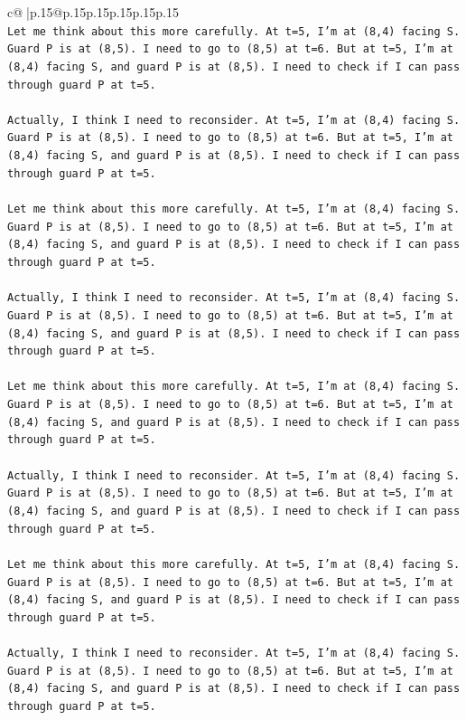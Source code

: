 \documentclass{article}
\begin{document}
{\begin{supertabular}{c@{$\;$}|p{.15\linewidth}@{}p{.15\linewidth}p{.15\linewidth}p{.15\linewidth}p{.15\linewidth}p{.15\linewidth}}
{{{\\ 
\texttt{Let me think about this more carefully. At t=5, I'm at (8,4) facing S. Guard P is at (8,5). I need to go to (8,5) at t=6. But at t=5, I'm at (8,4) facing S, and guard P is at (8,5). I need to check if I can pass through guard P at t=5.} \\
\\ 
\texttt{Actually, I think I need to reconsider. At t=5, I'm at (8,4) facing S. Guard P is at (8,5). I need to go to (8,5) at t=6. But at t=5, I'm at (8,4) facing S, and guard P is at (8,5). I need to check if I can pass through guard P at t=5.} \\
\\ 
\texttt{Let me think about this more carefully. At t=5, I'm at (8,4) facing S. Guard P is at (8,5). I need to go to (8,5) at t=6. But at t=5, I'm at (8,4) facing S, and guard P is at (8,5). I need to check if I can pass through guard P at t=5.} \\
\\ 
\texttt{Actually, I think I need to reconsider. At t=5, I'm at (8,4) facing S. Guard P is at (8,5). I need to go to (8,5) at t=6. But at t=5, I'm at (8,4) facing S, and guard P is at (8,5). I need to check if I can pass through guard P at t=5.} \\
\\ 
\texttt{Let me think about this more carefully. At t=5, I'm at (8,4) facing S. Guard P is at (8,5). I need to go to (8,5) at t=6. But at t=5, I'm at (8,4) facing S, and guard P is at (8,5). I need to check if I can pass through guard P at t=5.} \\
\\ 
\texttt{Actually, I think I need to reconsider. At t=5, I'm at (8,4) facing S. Guard P is at (8,5). I need to go to (8,5) at t=6. But at t=5, I'm at (8,4) facing S, and guard P is at (8,5). I need to check if I can pass through guard P at t=5.} \\
\\ 
\texttt{Let me think about this more carefully. At t=5, I'm at (8,4) facing S. Guard P is at (8,5). I need to go to (8,5) at t=6. But at t=5, I'm at (8,4) facing S, and guard P is at (8,5). I need to check if I can pass through guard P at t=5.} \\
\\ 
\texttt{Actually, I think I need to reconsider. At t=5, I'm at (8,4) facing S. Guard P is at (8,5). I need to go to (8,5) at t=6. But at t=5, I'm at (8,4) facing S, and guard P is at (8,5). I need to check if I can pass through guard P at t=5.} \\
}}}
\end{supertabular}}
\end{document}
